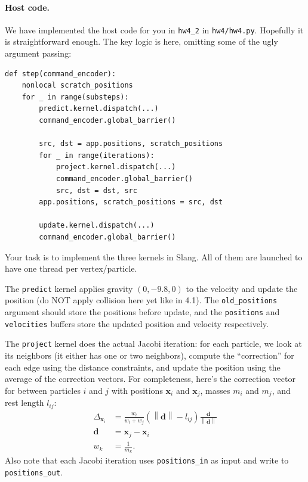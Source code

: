 \paragraph{Host code.} We have implemented the host code for you in \lstinline{hw4_2} in \lstinline{hw4/hw4.py}. Hopefully it is straightforward enough. The key logic is here, omitting some of the ugly argument passing:
\begin{lstlisting}
def step(command_encoder):
    nonlocal scratch_positions
    for _ in range(substeps):
        predict.kernel.dispatch(...)
        command_encoder.global_barrier()

        src, dst = app.positions, scratch_positions
        for _ in range(iterations):
            project.kernel.dispatch(...)
            command_encoder.global_barrier()
            src, dst = dst, src
        app.positions, scratch_positions = src, dst

        update.kernel.dispatch(...)
        command_encoder.global_barrier()
\end{lstlisting}

Your task is to implement the three kernels in Slang. All of them are launched to have one thread per vertex/particle. 

The \lstinline{predict} kernel applies gravity $(0, -9.8, 0)$ to the velocity and update the position (do NOT apply collision here yet like in 4.1). The \lstinline{old_positions} argument should store the positions before update, and the \lstinline{positions} and \lstinline{velocities} buffers store the updated position and velocity respectively.

The \lstinline{project} kernel does the actual Jacobi iteration: for each particle, we look at its neighbors (it either has one or two neighbors), compute the ``correction'' for each edge using the distance constraints, and update the position using the average of the correction vectors. 
For completeness, here's the correction vector for between particles $i$ and $j$ with positions $\mathbf{x}_i$ and $\mathbf{x}_j$, masses $m_i$ and $m_j$, and rest length $l_{ij}$:
\begin{equation}
\begin{aligned}
\Delta_{\mathbf{x}_i} &= \frac{w_i}{w_i + w_j} \left(\left\|\mathbf{d}\right\| - l_{ij}\right) \frac{\mathbf{d}}{\left\|\mathbf{d}\right\|} \\
\mathbf{d} &= \mathbf{x}_j - \mathbf{x}_i \\
w_k &= \frac{1}{m_k}.
\end{aligned}
\end{equation}
Also note that each Jacobi iteration uses \lstinline{positions_in} as input and write to \lstinline{positions_out}. 

